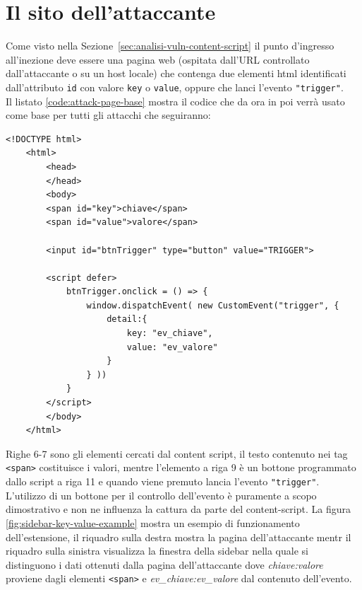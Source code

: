 \documentclass{sapthesis}
\newcommand{\code}[1]{\texttt{#1}}
\newcommand{\refSection}[1]{Sezione~\ref{#1}}
\begin{document}
    \section{Il sito dell'attaccante}
    \label{sec:attaccando-vuln-sito}
        Come visto nella \refSection{sec:analisi-vuln-content-script} il punto d'ingresso all'inezione
        deve essere una pagina web (ospitata dall'URL controllato dall'attaccante o su un host locale)
        che contenga due elementi html identificati dall'attributo \code{id} con valore \code{key} o
        \code{value}, oppure che lanci l'evento \code{"trigger"}.\\
        Il listato \ref{code:attack-page-base} mostra il codice che da ora in poi verrà usato come base per tutti gli attacchi
        che seguiranno:
        \begin{lstlisting}[caption={codice html della pagina di attacco}, captionpos=b, label={code:attack-page-base}]
    <!DOCTYPE html>
    <html>
        <head>
        </head>
        <body>
        <span id="key">chiave</span>
        <span id="value">valore</span>
        
        <input id="btnTrigger" type="button" value="TRIGGER">
    
        <script defer>
            btnTrigger.onclick = () => {
                window.dispatchEvent( new CustomEvent("trigger", {
                    detail:{
                        key: "ev_chiave", 
                        value: "ev_valore" 
                    }
                } ))
            }
        </script>
        </body>
    </html>
        \end{lstlisting}
        Righe 6-7 sono gli elementi cercati dal content script, il testo contenuto nei tag \code{<span>}
        costituisce i valori, mentre l'elemento a riga 9 è un bottone programmato dallo script a riga 11
        e quando viene premuto lancia l'evento \code{"trigger"}. L'utilizzo di un bottone per il
        controllo dell'evento è puramente a scopo dimostrativo e non ne influenza la cattura da parte
        del content-script.
        La figura \ref{fig:sidebar-key-value-example} mostra un esempio di funzionamento dell'estensione,
        il riquadro sulla destra mostra la pagina dell'attaccante mentr il riquadro sulla sinistra visualizza 
        la finestra della sidebar nella quale si distinguono
        i dati ottenuti dalla pagina dell'attaccante dove \textit{chiave:valore} proviene dagli
        elementi \code{<span>} e \textit{ev\_chiave:ev\_valore} dal contenuto dell'evento.
\end{document}
